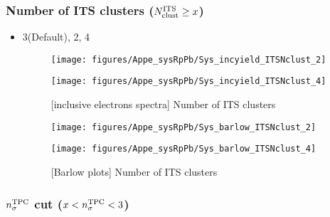 \subsubsection{Number of ITS clusters ($N_{\rm{clust}}^{\rm{ITS}} \geq x$)}
\label{subsub:appe_sys_RpPb_NITSclust}

 \begin{itemize}
      \item 3(Default), 2, 4
      
            \begin{figure}[H]
      	\begin{minipage}{0.5\hsize} 
      	\begin{center}
      	\texttt{[image: figures/Appe\_sysRpPb/Sys\_incyield\_ITSNclust\_2]}
      	\end{center}
      	\end{minipage}
      	\begin{minipage}{0.5\hsize} 
      	\begin{center}
      	\texttt{[image: figures/Appe\_sysRpPb/Sys\_incyield\_ITSNclust\_4]}
      	\end{center}
      	\end{minipage}
      \caption{[inclusive electrons spectra] Number of ITS clusters}
      \label{fig:Sys_ITSclust}
      \end{figure}
      
      \begin{figure}[H]
      	\begin{minipage}{0.5\hsize} 
      	\begin{center}
      	\texttt{[image: figures/Appe\_sysRpPb/Sys\_barlow\_ITSNclust\_2]}
      	\end{center}
      	\end{minipage}
      	\begin{minipage}{0.5\hsize} 
      	\begin{center}
      	\texttt{[image: figures/Appe\_sysRpPb/Sys\_barlow\_ITSNclust\_4]}
      	\end{center}
      	\end{minipage}
      \caption{[Barlow plots] Number of ITS clusters}
      \label{fig:Sys_ITSNclust}
      \end{figure}
      
 \end{itemize}


\subsubsection{$n_{\sigma}^{\rm{TPC}}$ cut ($x < n_{\sigma}^{\rm{TPC}} < 3 $)}
\label{subsub:appe_sys_RpPb_TPCnsigma}

